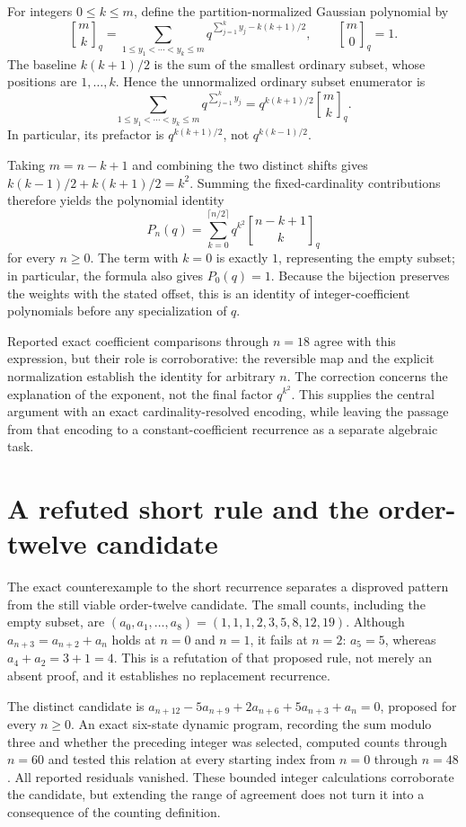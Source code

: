 \documentclass[11pt]{article}
\begin{document}
For integers $0\leq k\leq m$, define the partition-normalized Gaussian polynomial by
\[
\genfrac{[}{]}{0pt}{}{m}{k}_q = \sum_{1\leq y_1<\cdots<y_k\leq m} q^{\sum_{j=1}^{k}y_j-k(k+1)/2},
\qquad \genfrac{[}{]}{0pt}{}{m}{0}_q=1.
\]
The baseline $k(k+1)/2$ is the sum of the smallest ordinary subset, whose positions are $1,\ldots,k$. Hence the unnormalized ordinary subset enumerator is
\[
\sum_{1\leq y_1<\cdots<y_k\leq m}q^{\sum_{j=1}^{k}y_j}=q^{k(k+1)/2}\genfrac{[}{]}{0pt}{}{m}{k}_q.
\]
In particular, its prefactor is $q^{k(k+1)/2}$, not $q^{k(k-1)/2}$.

Taking $m=n-k+1$ and combining the two distinct shifts gives $k(k-1)/2+k(k+1)/2=k^2$. Summing the fixed-cardinality contributions therefore yields the polynomial identity
\[
P_n(q)=\sum_{k=0}^{\lceil n/2\rceil}q^{k^2}\genfrac{[}{]}{0pt}{}{n-k+1}{k}_q
\]
for every $n\geq 0$. The term with $k=0$ is exactly $1$, representing the empty subset; in particular, the formula also gives $P_0(q)=1$. Because the bijection preserves the weights with the stated offset, this is an identity of integer-coefficient polynomials before any specialization of $q$.

Reported exact coefficient comparisons through $n=18$ agree with this expression, but their role is corroborative: the reversible map and the explicit normalization establish the identity for arbitrary $n$. The correction concerns the explanation of the exponent, not the final factor $q^{k^2}$. This supplies the central argument with an exact cardinality-resolved encoding, while leaving the passage from that encoding to a constant-coefficient recurrence as a separate algebraic task.

\section{A refuted short rule and the order-twelve candidate}
The exact counterexample to the short recurrence separates a disproved pattern from the still viable order-twelve candidate. The small counts, including the empty subset, are $(a_0,a_1,\ldots,a_8)=(1,1,1,2,3,5,8,12,19)$. Although $a_{n+3}=a_{n+2}+a_n$ holds at $n=0$ and $n=1$, it fails at $n=2$: $a_5=5$, whereas $a_4+a_2=3+1=4$. This is a refutation of that proposed rule, not merely an absent proof, and it establishes no replacement recurrence.

The distinct candidate is $a_{n+12}-5a_{n+9}+2a_{n+6}+5a_{n+3}+a_n=0$, proposed for every $n\geq 0$. An exact six-state dynamic program, recording the sum modulo three and whether the preceding integer was selected, computed counts through $n=60$ and tested this relation at every starting index from $n=0$ through $n=48$. All reported residuals vanished. These bounded integer calculations corroborate the candidate, but extending the range of agreement does not turn it into a consequence of the counting definition.
\end{document}
